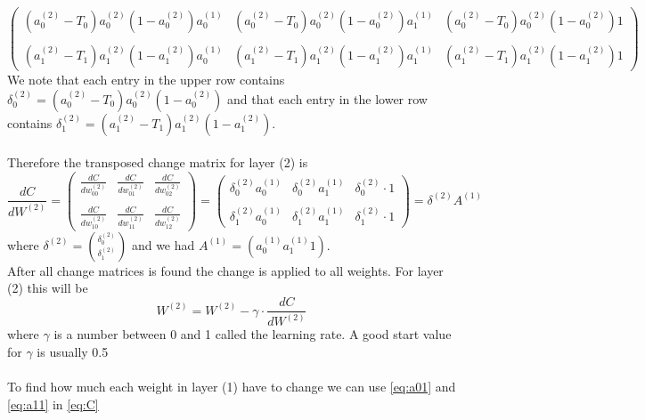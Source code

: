\documentclass{article}
\begin{document}
$$\begin{pmatrix}
(a_0^{(2)}-T_0)a_0^{(2)}(1-a_0^{(2)})a_0^{(1)} & (a_0^{(2)}-T_0)a_0^{(2)}(1-a_0^{(2)})a_1^{(1)} & (a_0^{(2)}-T_0)a_0^{(2)}(1-a_0^{(2)})1
\\\\
(a_1^{(2)}-T_1)a_1^{(2)}(1-a_1^{(2)})a_0^{(1)} & (a_1^{(2)}-T_1)a_1^{(2)}(1-a_1^{(2)})a_1^{(1)} & (a_1^{(2)}-T_1)a_1^{(2)}(1-a_1^{(2)})1
\end{pmatrix}$$
We note that each entry in the upper row contains $\delta_0^{(2)} = (a_0^{(2)}-T_0)a_0^{(2)}(1-a_0^{(2)})$ and that each entry in the lower row contains $\delta_1^{(2)} = (a_1^{(2)}-T_1)a_1^{(2)}(1-a_1^{(2)})$.
\\\\
Therefore the transposed change matrix for layer (2) is $$\frac{dC}{dW^{(2)}} = 
\begin{pmatrix}
\frac{dC}{dw_{00}^{(2)}} & \frac{dC}{dw_{01}^{(2)}} & \frac{dC}{dw_{02}^{(2)}}
\\\\
\frac{dC}{dw_{10}^{(2)}} & \frac{dC}{dw_{11}^{(2)}} & \frac{dC}{dw_{12}^{(2)}} 
\end{pmatrix} = \begin{pmatrix}
\delta_0^{(2)}a_0^{(1)} & \delta_0^{(2)}a_1^{(1)} & \delta_0^{(2)} \cdot 1
\\\\
\delta_1^{(2)}a_0^{(1)} & \delta_1^{(2)}a_1^{(1)} & \delta_1^{(2)} \cdot 1
\end{pmatrix} = \delta^{(2)}A^{(1)}
$$
where $\delta^{(2)} = \binom{\delta_0^{(2)}}{\delta_1^{(2)}}$
and we had $A^{(1)} = (a_0^{(1)} a_1^{(1)} 1)$.
\\
After all change matrices is found the change is applied to all weights. For layer (2) this will be $$W^{(2)} = W^{(2)} - \gamma \cdot \frac{dC}{dW^{(2)}}$$
where $\gamma$ is a number between 0 and 1 called the learning rate. A good start value for $\gamma$ is usually 0.5
\\\\
To find how much each weight in layer (1) have to change we can use \eqref{eq:a01} and \eqref{eq:a11} in \eqref{eq:C}
\end{document}
